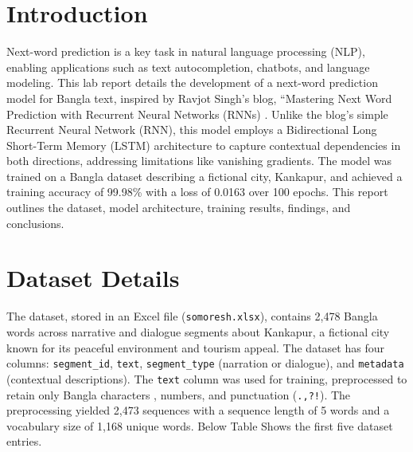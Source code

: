 \documentclass[12pt]{article}
\begin{document}
\section*{Introduction}
Next-word prediction is a key task in natural language processing (NLP), enabling applications such as text autocompletion, chatbots, and language modeling. This lab report details the development of a next-word prediction model for Bangla text, inspired by Ravjot Singh's blog, ``Mastering Next Word Prediction with Recurrent Neural Networks (RNNs) . Unlike the blog's simple Recurrent Neural Network (RNN), this model employs a Bidirectional Long Short-Term Memory (LSTM) architecture to capture contextual dependencies in both directions, addressing limitations like vanishing gradients. The model was trained on a Bangla dataset describing a fictional city, Kankapur, and achieved a training accuracy of 99.98\% with a loss of 0.0163 over 100 epochs. This report outlines the dataset, model architecture, training results, findings, and conclusions.

\section*{Dataset Details}
The dataset, stored in an Excel file (\texttt{somoresh.xlsx}), contains 2,478 Bangla words across narrative and dialogue segments about Kankapur, a fictional city known for its peaceful environment and tourism appeal. The dataset has four columns: \texttt{segment\_id}, \texttt{text}, \texttt{segment\_type} (narration or dialogue), and \texttt{metadata} (contextual descriptions). The \texttt{text} column was used for training, preprocessed to retain only Bangla characters , numbers, and punctuation (\texttt{.,?!}). The preprocessing yielded 2,473 sequences with a sequence length of 5 words and a vocabulary size of 1,168 unique words. Below Table Shows the first five dataset entries.
\end{document}
